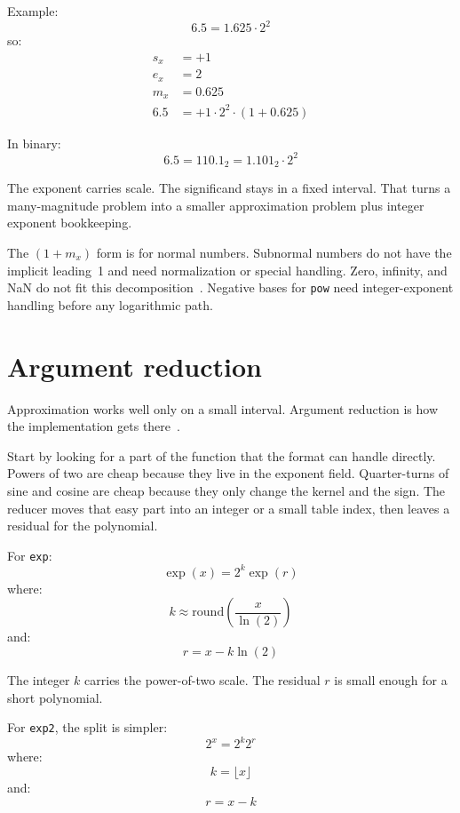 \documentclass[manuscript, nonacm]{acmart}
\begin{document}
    Example:
    \[ 6.5 = 1.625 \cdot 2^2 \]
    so:
    \begin{align*}
        s_x &= +1 \\
        e_x &= 2 \\
        m_x &= 0.625 \\
        6.5 &= +1 \cdot 2^2 \cdot (1 + 0.625)
    \end{align*}

    In binary:
    \[ 6.5 = 110.1_2 = 1.101_2 \cdot 2^2 \]

    The exponent carries scale. The significand stays in a fixed interval.
    That turns a many-magnitude problem into a smaller approximation problem plus
    integer exponent bookkeeping.

    The $(1 + m_x)$ form is for normal numbers. Subnormal numbers do not have
    the implicit leading~1 and need normalization or special handling. Zero,
    infinity, and NaN do not fit this decomposition~\cite{ieee}. Negative bases
    for \texttt{pow} need integer-exponent handling before any logarithmic path.



    \section{Argument reduction}

    Approximation works well only on a small interval. Argument reduction is
    how the implementation gets there~\cite{muller,handbook}.

    Start by looking for a part of the function that the format can handle
    directly. Powers of two are cheap because they live in the exponent field.
    Quarter-turns of sine and cosine are cheap because they only change the
    kernel and the sign. The reducer moves that easy part into an integer or a
    small table index, then leaves a residual for the polynomial.

    For \texttt{exp}:
    \[ \exp(x) = 2^k \exp(r) \]
    where:
    \[ k \approx \mathrm{round}\!\left(\frac{x}{\ln(2)}\right) \]
    and:
    \[ r = x - k\ln(2) \]

    The integer $k$ carries the power-of-two scale. The residual $r$ is small
    enough for a short polynomial.

    For \texttt{exp2}, the split is simpler:
    \[ 2^x = 2^k 2^r \]
    where:
    \[ k = \lfloor x \rfloor \]
    and:
    \[ r = x - k \]
\end{document}
